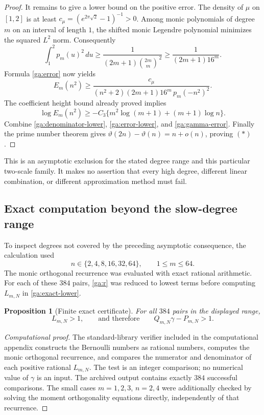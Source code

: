 \documentclass[11pt,a4paper]{article}
\numberwithin{equation}{section}
\newtheorem{proposition}[theorem]{Proposition}
\theoremstyle{definition}
\theoremstyle{remark}
\begin{document}
\begin{proof}
It remains to give a lower bound on the positive error.  The density
of $\mu$ on $[1,2]$ is at least
$c_\mu=(e^{2\pi\sqrt2}-1)^{-1}>0$.
Among monic polynomials of degree $m$ on an interval of length $1$,
the shifted monic Legendre polynomial minimizes the squared
$L^2$ norm.  Consequently
\[
 \int_1^2p_m(u)^2\,du
 \ge\frac1{(2m+1)\binom{2m}{m}^{\,2}}
 \ge\frac1{(2m+1)16^m}.
\]
Formula \eqref{ga:error} now yields
\[
 E_m(n^2)\ge
 \frac{c_\mu}
 {(n^2+2)(2m+1)16^m\,p_m(-n^2)^2}.
\]
The coefficient height bound already proved implies
\begin{equation}\label{ga:error-lower}
 \log E_m(n^2)\ge
 -C_3\{m^2\log(m+1)+(m+1)\log n\}.
\end{equation}
Combine \eqref{ga:denominator-lower},
\eqref{ga:error-lower}, and \eqref{ga:gamma-error}.
Finally the prime number theorem gives
$\vartheta(2n)-\vartheta(n)=n+o(n)$, proving $(\ast)$.
\end{proof}

This is an asymptotic exclusion for the stated degree range and this
particular two-scale family.  It makes no assertion that every high
degree, different linear combination, or different approximation
method must fail.

\subsection{Exact computation beyond the slow-degree range}
\label{ga:finite-audit}

To inspect degrees not covered by the preceding asymptotic
consequence, the calculation used
\[
 n\in\{2,4,8,16,32,64\},\qquad 1\le m\le64.
\]
The monic orthogonal recurrence was evaluated with exact rational
arithmetic.  For each of these $384$ pairs, \eqref{ga:r} was reduced
to lowest terms before computing $L_{m,N}$ in
\eqref{ga:exact-lower}.

\begin{proposition}[Finite exact certificate]
\label{ga:384}
For all $384$ pairs in the displayed range,
\[
                 L_{m,N}>1,
 \qquad\text{and therefore}\qquad
                 Q_{m,N}\gamma-P_{m,N}>1.
\]
\end{proposition}
\begin{proof}[Computational proof]
The standard-library verifier included in the computational appendix
constructs the Bernoulli numbers as rational numbers, computes the
monic orthogonal recurrence, and compares the numerator and
denominator of each positive rational $L_{m,N}$.
The test is an integer comparison; no numerical value of $\gamma$
is an input.  The archived output contains exactly $384$ successful
comparisons.  The small cases $m=1,2,3$, $n=2,4$ were additionally
checked by solving the moment orthogonality equations directly,
independently of that recurrence.
\end{proof}
\end{document}
